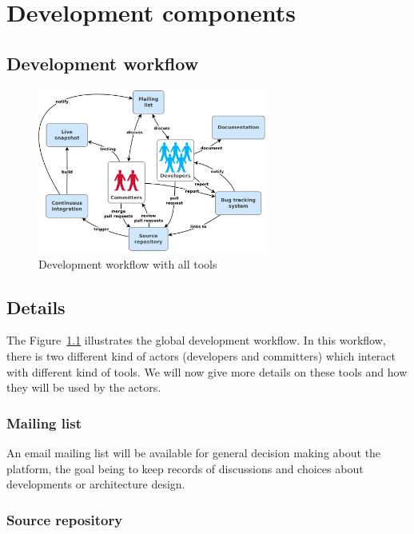 \chapter{Development components}
\label{ch:development-components}

\section{Development workflow}
\label{sec:development-workflow}

\begin{figure}
\centering
\includegraphics[width=0.67\textwidth]{images/development-workflow.png}
\caption{Development workflow with all tools}
\label{fig:development-workflow}
\end{figure}

\section{Details}
\label{sec:details}

The Figure~\ref{fig:development-workflow} illustrates the global development workflow.
In this workflow, there is two different kind of actors (developers and committers) which interact with different kind of tools.
We will now give more details on these tools and how they will be used by the actors.

\subsection{Mailing list}
\label{sec:mailing-list}

An email mailing list will be available for general decision making about the platform,
the goal being to keep records of discussions and choices about developments or architecture design.

\subsection{Source repository}
\label{sec:source-repository}

